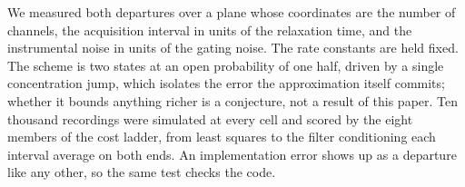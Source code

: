 We measured both departures over a plane whose coordinates are the number of channels, the
acquisition interval in units of the relaxation time, and the instrumental noise in units of the
gating noise. The rate constants are held fixed. The scheme is two states at an open probability of
one half, driven by a single concentration jump, which isolates the error the approximation itself
commits; whether it bounds anything richer is a conjecture, not a result of this paper.
Ten thousand recordings were simulated at every cell and scored by
the eight members of the cost ladder, from least squares to the filter conditioning each interval
average on both ends. An implementation error shows up as a departure like any other, so the same
test checks the code.
